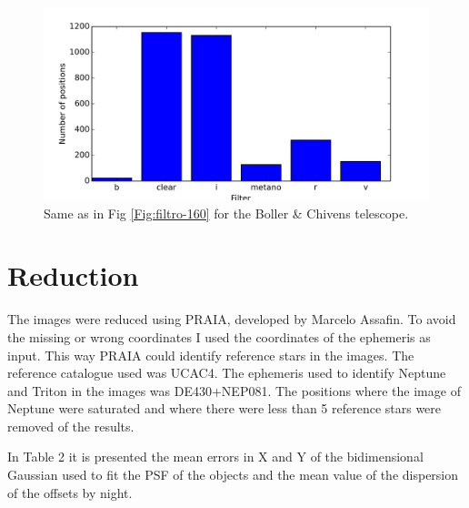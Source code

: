 \documentclass[12pt,a4paper]{report}
\newcommand{\BC}{Boller \& Chivens }
\begin{document}
\begin{figure}[H]
\includegraphics[width=16.0cm]{filtro_IAG.png} 
\caption{Same as in Fig \ref{Fig:filtro-160} for the \BC telescope.}
\label{Fig:filtro-IAG}
\end{figure}



\section*{Reduction}

The images were reduced using PRAIA, developed by Marcelo Assafin. To avoid the missing or wrong coordinates I used the coordinates of the ephemeris as input. This way PRAIA could identify reference stars in the images. The reference catalogue used was UCAC4. The ephemeris used to identify Neptune and Triton in the images was DE430+NEP081. The positions where the image of Neptune were saturated and where there were less than 5 reference stars were removed of the results.

In Table 2 it is presented the mean errors in X and Y of the bidimensional Gaussian used to fit the PSF of the objects and the mean value of the dispersion of the offsets by night.
\end{document}
